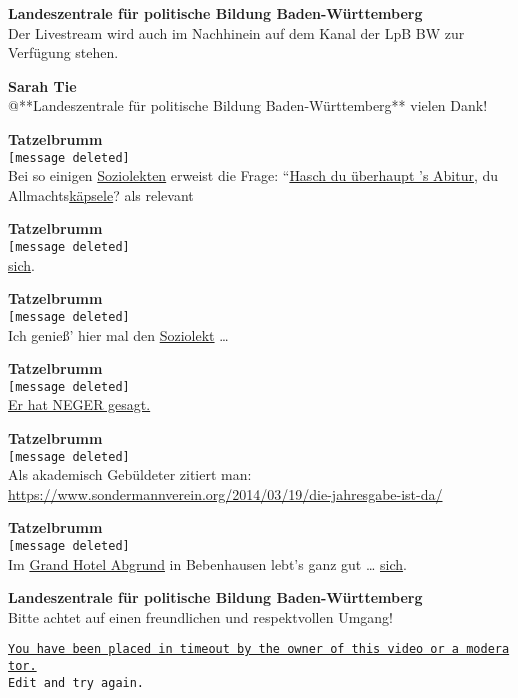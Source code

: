 \documentclass[]{article}
\begin{document}
\textbf{Landeszentrale für politische Bildung Baden-Württemberg}\\
Der Livestream wird auch im Nachhinein auf dem Kanal der LpB BW zur
Verfügung stehen.

\textbf{Sarah Tie}\\
@**Landeszentrale für politische Bildung Baden-Württemberg** vielen
Dank!

\textbf{Tatzelbrumm}\\
\texttt{{[}message\ deleted{]}}\\
Bei so einigen \protect\hyperlink{Soziolekt}{Soziolekten} erweist die
Frage: ``\protect\hyperlink{Saudaemliche-Details}{Hasch du überhaupt 's
Abitur}, du Allmachts\protect\hyperlink{Kaepsele}{käpsele}? als relevant

\textbf{Tatzelbrumm}\\
\texttt{{[}message\ deleted{]}}\\
\protect\hyperlink{Das-postponierte-Reflexivum}{sich}.

\textbf{Tatzelbrumm}\\
\texttt{{[}message\ deleted{]}}\\
Ich genieß' hier mal den \protect\hyperlink{Soziolekt}{Soziolekt}
\ldots{}

\textbf{Tatzelbrumm}\\
\texttt{{[}message\ deleted{]}}\\
\protect\hyperlink{Neger}{Er hat NEGER gesagt.}

\textbf{Tatzelbrumm}\\
\texttt{{[}message\ deleted{]}}\\
Als akademisch Gebüldeter zitiert man:\\
\protect\hyperlink{Schwuler-Fussball}{https://www.sondermannverein.org/2014/03/19/die-jahresgabe-ist-da/}

\textbf{Tatzelbrumm}\\
\texttt{{[}message\ deleted{]}}\\
Im \protect\hyperlink{Grand-Hotel-Abgrund}{Grand Hotel Abgrund} in
Bebenhausen lebt's ganz gut \ldots{}
\protect\hyperlink{Das-postponierte-Reflexivum}{sich}.

\textbf{Landeszentrale für politische Bildung Baden-Württemberg}\\
Bitte achtet auf einen freundlichen und respektvollen Umgang!

\href{https://youtu.be/jSiCjzEgx1k?t=23}{\texttt{You\ have\ been\ placed\ in\ timeout\ by\ the\ owner\ of\ this\ video\ or\ a\ moderator.}}\\
\texttt{Edit\ and\ try\ again.}
\end{document}
